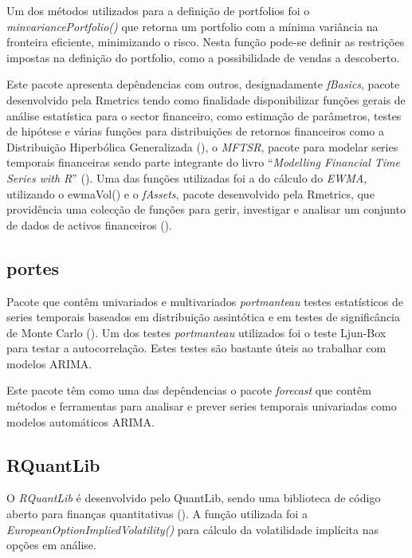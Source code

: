 \documentclass[
  12pt,
  a4paper,
  openany]{book}
\begin{document}
Um dos métodos utilizados para a definição de portfolios foi o \emph{minvariancePortfolio()} que retorna um portfolio com a mínima variância na fronteira eficiente, minimizando o risco. Nesta função pode-se definir as restrições impostas na definição do portfolio, como a possibilidade de vendas a descoberto.

Este pacote apresenta depêndencias com outros, designadamente \emph{fBasics}, pacote desenvolvido pela Rmetrics tendo como finalidade disponibilizar funções gerais de análise estatística para o sector financeiro, como estimação de parâmetros, testes de hipótese e várias funções para distribuições de retornos financeiros como a Distribuição Hiperbólica Generalizada (\citet{fBasics}), o \emph{MFTSR}, pacote para modelar series temporais financeiras sendo parte integrante do livro ``\emph{Modelling Financial Time Series with R}'' (\citet{MFTSR}). Uma das funções utilizadas foi a do cálculo do \emph{EWMA}, utilizando o ewmaVol() e o \emph{fAssets}, pacote desenvolvido pela Rmetrics, que providência uma colecção de funções para gerir, investigar e analisar um conjunto de dados de activos financeiros (\citet{fAssets}).

\hypertarget{portes}{%
\subsection{portes}\label{portes}}

Pacote que contêm univariados e multivariados \emph{portmanteau} testes estatísticos de series temporais baseados em distribuição assintótica e em testes de significância de Monte Carlo (\citet{portes}). Um dos testes \emph{portmanteau} utilizados foi o teste Ljun-Box para testar a autocorrelação. Estes testes são bastante úteis ao trabalhar com modelos ARIMA.

Este pacote têm como uma das depêndencias o pacote \emph{forecast} que contêm métodos e ferramentas para analisar e prever series temporais univariadas como modelos automáticos ARIMA.

\hypertarget{rquantlib}{%
\subsection{RQuantLib}\label{rquantlib}}

O \emph{RQuantLib} é desenvolvido pelo QuantLib, sendo uma biblioteca de código aberto para finanças quantitativas (\citet{RQuantLib}). A função utilizada foi a \emph{EuropeanOptionImpliedVolatility()} para cálculo da volatilidade implícita nas opções em análise.
\end{document}
